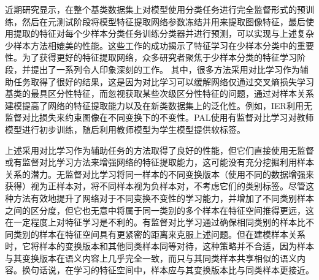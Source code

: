 近期研究\cite{dhillon2019baseline, chencloser, RFS}显示，在整个基类数据集上对模型使用分类任务进行完全监督形式的预训练，然后在元测试阶段将模型特征提取网络参数冻结并用来提取图像特征，最后使用提取的特征对每个少样本分类任务训练分类器并进行预测，可以实现与上述复杂少样本方法相媲美的性能。这些工作的成功揭示了特征学习在少样本分类中的重要性。为了获得更好的特征提取网络，众多研究者聚焦于少样本分类的特征学习阶段，并提出了一系列令人印象深刻的工作\cite{RFS, IER, PAL, HandCrafted, Spatial, lee2020self, IEPT, ESPT}。
其中，很多方法采用对比学习作为辅助任务取得了很好的结果\cite{IER, PAL, Spatial}，这是因为对比学习可以缓解网络仅通过交叉熵损失学习基类的最具区分性特征，而忽视获取某些次级区分性特征的问题，通过对样本关系建模提高了网络的特征提取能力以及在新类数据集上的泛化性。例如，IER\cite{IER}利用无监督对比损失来约束图像在不同变换下的不变性。PAL\cite{PAL}使用有监督对比学习\cite{SupCon}对教师模型进行初步训练，随后利用教师模型为学生模型提供软标签。

上述采用对比学习作为辅助任务的方法取得了良好的性能，但它们直接使用无监督或有监督对比学习方法来增强网络的特征提取能力，这可能没有充分挖掘利用样本关系的潜力。无监督对比学习\cite{SimCLR, MoCo}将同一样本的不同变换版本（使用不同的数据增强来获得）视为正样本对，将不同样本视为负样本对，不考虑它们的类别标签。尽管这种方法有效地提升了网络对于不同变换不变性的学习能力，并增加了不同类别样本之间的区分度，但它也无意中将属于同一类别的多个样本在特征空间推得更远，这在一定程度上对特征学习是不利的。有监督对比学习\cite{SupCon}通过确保相同类别的样本比不同类别的样本在特征空间具有更紧密的距离来克服上述问题。但在建模样本关系时，它将样本的变换版本和其他同类样本同等对待，这种策略并不合适，因为样本与其变换版本在语义内容上几乎完全一致，而只与其同类样本共享相似的语义内容。换句话说，在学习的特征空间中，样本应与其变换版本比与同类样本更接近。

